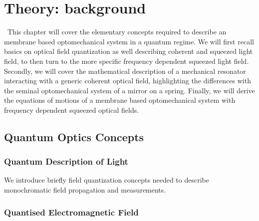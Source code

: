 \newcommand{\adag}[1]{\hat{a}_{#1}^\dagger}
\newcommand{\aop}[1]{\hat{a}_{#1\vphantom{\dagger}}}

\chapter{ Theory: background}\label{chap:theory}
\etocsettocstyle{\section*{\contentsname}}{}
\localtableofcontents\
This chapter will cover the elementary concepts required to describe an membrane based optomechanical system in a quantum regime. We will first recall basics on optical field quantization as well describing coherent and squeezed light field, to then turn to the more specific frequency dependent squeezed light field. Secondly, we will cover the mathematical description of a mechanical resonator interacting with a generic coherent optical field, highlighting the differences with the seminal optomechanical system of a mirror on a spring. Finally, we will derive the equations of motions of a membrane based optomechanical system with frequency dependent squeezed optical fields. 

\section{Quantum Optics Concepts}
\subsection{Quantum Description of Light}
We introduce briefly field quantization concepts needed to describe monochromatic field propagation and measurements.

\subsection*{Quantised Electromagnetic Field}

